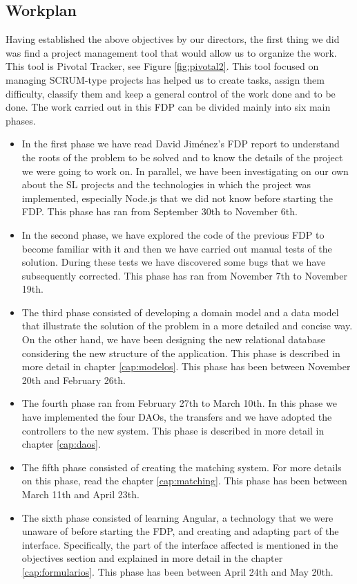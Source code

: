 \documentclass[11pt]{book}
\begin{document}
\begin{itemize}
		\section{Workplan}
		Having established the above objectives by our directors, the first thing we did was find a project management tool that would allow us to organize the work. This tool is Pivotal Tracker, see Figure \ref {fig:pivotal2}. This tool focused on managing SCRUM-type projects has helped us to create tasks, assign them difficulty, classify them and keep a general control of the work done and to be done. The work carried out in this FDP can be divided mainly into six main phases.
		\begin{itemize} 
			\item In the first phase we have read David Jiménez's FDP report to understand the roots of the problem to be solved and to know the details of the project we were going to work on. In parallel, we have been investigating on our own about the SL projects and the technologies in which the project was implemented, especially Node.js that we did not know before starting the FDP. This phase has ran from September 30th to November 6th.
			\item In the second phase, we have explored the code of the previous FDP to become familiar with it and then we have carried out manual tests of the solution. During these tests we have discovered some bugs that we have subsequently corrected. This phase has ran from November 7th to November 19th.
			\item The third phase consisted of developing a domain model and a data model that illustrate the solution of the problem in a more detailed and concise way. On the other hand, we have been designing the new relational database considering the new structure of the application. This phase is described in more detail in chapter \ref{cap:modelos}. This phase has been between November 20th and February 26th.
			\item The fourth phase ran from February 27th to March 10th. In this phase we have implemented the four DAOs, the transfers and we have adopted the controllers to the new system. This phase is described in more detail in chapter \ref {cap:daos}.
			\item The fifth phase consisted of creating the matching system. For more details on this phase, read the chapter \ref{cap:matching}. This phase has been between March 11th and April 23th.
			\item The sixth phase consisted of learning Angular, a technology that we were unaware of before starting the FDP, and creating and adapting part of the interface. Specifically, the part of the interface affected is mentioned in the objectives section and explained in more detail in the chapter \ref {cap:formularios}. This phase has been between April 24th and May 20th.
			
		\end{itemize}
		
	\end{itemize}
\end{document}
